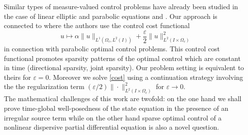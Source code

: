 Similar types of measure-valued control problems have already been studied in the case of linear elliptic and parabolic equations \cite{pieper2013priori,clason2011duality,casas2012approximation,ClasonKunisch:2011b} and \cite{casas2013parabolic,CasasZuazua13,CasasVexlerZuazua13,CasasKunisch15}. Our approach is connected to \cite{herzog2012directional} where the authors use the control cost functional
\[
u\mapsto\alpha \|u\|_{L^1(\Omega_c,L^2(I))}+\frac \varepsilon 2 \|u\|_{L^2(I\times \Omega_c)}^2
\]
in connection with parabolic optimal control problems. This control cost functional promotes sparsity patterns of the optimal control which are constant in time (directional sparsity, joint sparsity). Our problem setting is equivalent to theirs for $\varepsilon=0$. Moreover we solve \eqref{cost} using a continuation strategy involving the the regularization term $(\varepsilon/2)\|\cdot\|_{L^2(I\times \Omega_c)}^2$ for $\varepsilon\rightarrow 0$.\\
The mathematical challenges of this work are twofold: on the one hand we shall prove time-global well-posedness of the state equation in the presence of an irregular source term while on the other hand sparse optimal control of a nonlinear dispersive partial differential equation is also a novel question.\\

